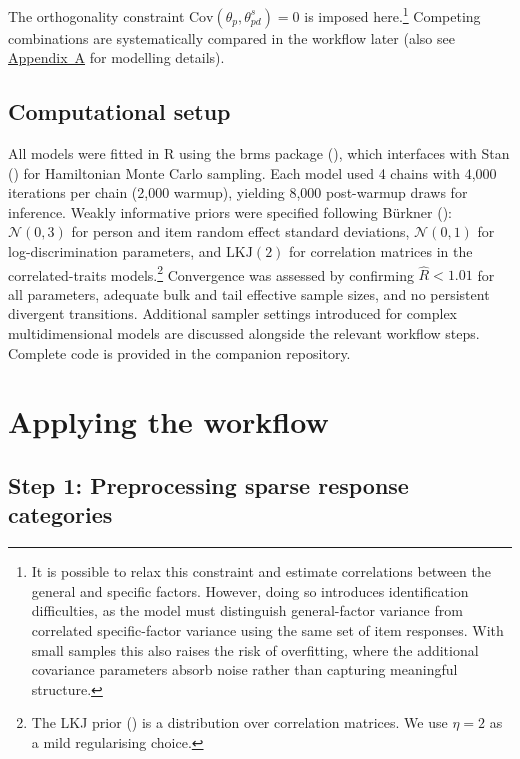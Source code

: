 \documentclass[
  man,
  floatsintext,
  longtable,
  nolmodern,
  notxfonts,
  notimes,
  colorlinks=true,linkcolor=blue,citecolor=blue,urlcolor=blue]{apa7}
\begin{document}
The orthogonality constraint
\(\text{Cov}(\theta_p, \theta_{pd}^{s}) = 0\) is imposed
here.\footnote{It is possible to relax this constraint and estimate
  correlations between the general and specific factors. However, doing
  so introduces identification difficulties, as the model must
  distinguish general-factor variance from correlated specific-factor
  variance using the same set of item responses. With small samples this
  also raises the risk of overfitting, where the additional covariance
  parameters absorb noise rather than capturing meaningful structure.}
Competing combinations are systematically compared in the workflow later
(also see \hyperref[apx-models]{Appendix~A} for modelling details).

\subsection{Computational setup}\label{computational-setup}

All models were fitted in R using the brms package
(), which interfaces with
Stan () for
Hamiltonian Monte Carlo sampling. Each model used 4 chains with 4,000
iterations per chain (2,000 warmup), yielding 8,000 post-warmup draws
for inference. Weakly informative priors were specified following
Bürkner (): \(\mathcal{N}(0, 3)\)
for person and item random effect standard deviations,
\(\mathcal{N}(0, 1)\) for log-discrimination parameters, and
\(\text{LKJ}(2)\) for correlation matrices in the correlated-traits
models.\footnote{The LKJ prior
  () is a
  distribution over correlation matrices. We use \(\eta = 2\) as a mild
  regularising choice.} Convergence was assessed by confirming
\(\hat{R} < 1.01\) for all parameters, adequate bulk and tail effective
sample sizes, and no persistent divergent transitions. Additional
sampler settings introduced for complex multidimensional models are
discussed alongside the relevant workflow steps. Complete code is
provided in the companion repository.

\section{Applying the workflow}\label{applying-the-workflow}

\subsection{Step 1: Preprocessing sparse response
categories}\label{step-1-preprocessing-sparse-response-categories}
\end{document}
